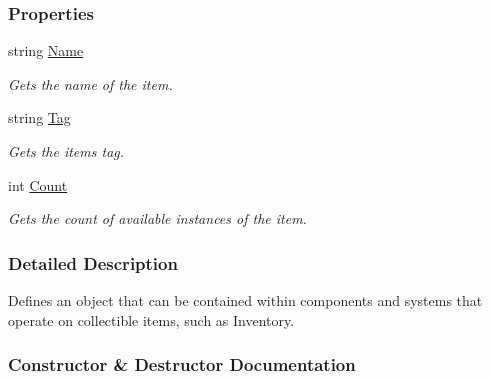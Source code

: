 \subsubsection*{Properties}
\begin{DoxyCompactItemize}
\item 
string \hyperlink{class_m_b2_d_1_1_collectable_a80d6ce8bb84f84a86ffbd58ad6237e9a}{Name}
\begin{DoxyCompactList}\small\item\em Gets the name of the item. \end{DoxyCompactList}\item 
string \hyperlink{class_m_b2_d_1_1_collectable_a97f42790fdafd06634b87cd4023bc0fe}{Tag}
\begin{DoxyCompactList}\small\item\em Gets the items tag. \end{DoxyCompactList}\item 
int \hyperlink{class_m_b2_d_1_1_collectable_a775364ada5d2f8095ca601657da20fc1}{Count}
\begin{DoxyCompactList}\small\item\em Gets the count of available instances of the item. \end{DoxyCompactList}\end{DoxyCompactItemize}


\subsubsection{Detailed Description}
Defines an object that can be contained within components and systems that operate on collectible items, such as Inventory. 



\subsubsection{Constructor \& Destructor Documentation}
\hypertarget{class_m_b2_d_1_1_collectable_af635d4c8ce7035b0553f0d0bf6c8a25e}{}\label{class_m_b2_d_1_1_collectable_af635d4c8ce7035b0553f0d0bf6c8a25e} 
